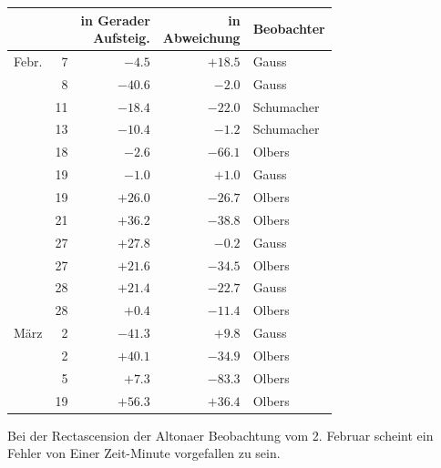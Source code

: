 \begin{center}
\begin{tabular}{lr|r|r|l}
 & & \shortstack{in Gerader\\Aufsteig.} & \shortstack{in\\Abweichung} & Beobachter \\
\hline
Febr. & 7 & $-4.5$ & $+18.5$ & Gauss \\
 & 8 & $-40.6$ & $-2.0$ & Gauss \\
 & 11 & $-18.4$ & $-22.0$ & Schumacher \\
 & 13 & $-10.4$ & $-1.2$ & Schumacher \\
 & 18 & $-2.6$ & $-66.1$ & Olbers \\
 & 19 & $-1.0$ & $+1.0$ & Gauss \\
 & 19 & $+26.0$ & $-26.7$ & Olbers \\
 & 21 & $+36.2$ & $-38.8$ & Olbers \\
 & 27 & $+27.8$ & $-0.2$ & Gauss \\
 & 27 & $+21.6$ & $-34.5$ & Olbers \\
 & 28 & $+21.4$ & $-22.7$ & Gauss \\
 & 28 & $+0.4$ & $-11.4$ & Olbers \\
März & 2 & $-41.3$ & $+9.8$ & Gauss \\
 & 2 & $+40.1$ & $-34.9$ & Olbers \\
 & 5 & $+7.3$ & $-83.3$ & Olbers \\
 & 19 & $+56.3$ & $+36.4$ & Olbers \\
\end{tabular}
\end{center}


Bei der Rectascension der Altonaer Beobachtung vom 2. Februar scheint ein
Fehler von Einer Zeit-Minute vorgefallen zu sein.
